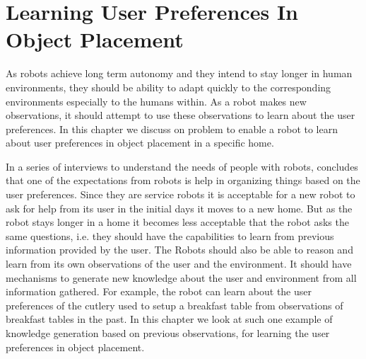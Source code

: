 \chapter{Learning User Preferences In Object Placement}
\label{chapter: object}

As robots achieve long term autonomy and they intend to stay longer in human environments, they should be ability to adapt quickly to the corresponding environments especially to the humans within. As a robot makes new observations, it should attempt to use these observations to learn about the user preferences. In this chapter we discuss on problem to enable a robot to learn about user preferences in object placement in a specific home. 

In a series of interviews to understand the needs of people with robots, \cite{pantofaru_exploring_2012} concludes that one of the
expectations from robots is help in organizing things based on the user preferences. Since they are service robots it is acceptable for a new robot to ask for help from its user in the initial days it moves to a new home. But as the robot stays longer in a home it becomes less acceptable that the robot asks the same questions, i.e. they should have the capabilities to learn from previous information provided by the user. The Robots should also be able to reason and learn from its own observations of the user and the environment. It should have mechanisms to generate new knowledge about the user and environment from all information gathered. For example, the robot can learn about the user preferences of the cutlery used to setup a breakfast table from observations of breakfast tables in the past. In this chapter we look at such one example of knowledge generation based on previous observations, for learning the user preferences in object placement.

